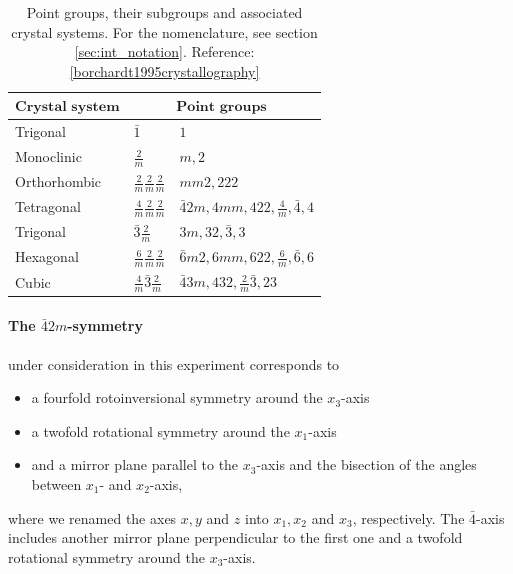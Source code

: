 \begin{table}[htdp]
    \begin{tabular}{|p{}|p{}|p{}|}
        \hline
        \rowcolor{LightCyan}
        $\textbf{Crystal system}$ & 
        \multicolumn{2}{|c|}{$\textbf{Point groups   }$} \\ 
        \hline
        Trigonal        & $ \bar{1} $   & $ 1 $  \\ 
        Monoclinic      & $\frac{2}{m}$ & $m, 2$     \\ 
        Orthorhombic    & $\frac{2}{m} \frac{2}{m} \frac{2}{m}$ & $mm2, 222$     \\
        Tetragonal      & $\frac{4}{m} \frac{2}{m} \frac{2}{m}$ & $\bar{4}2m, 4mm, 422, \frac{4}{m}, \bar{4}, 4$     \\ 
        Trigonal        & $\bar{3} \frac{2}{m}$         & $3m, 32, \bar{3}, 3$      \\ 
        Hexagonal       & $\frac{6}{m} \frac{2}{m} \frac{2}{m}$ & $\bar{6}m2, 6mm, 622, \frac{6}{m}, \bar{6}, 6$     \\ 
        Cubic           & $\frac{4}{m}\bar{3}\frac{2}{m}$ & $\bar{4}3m, 432, \frac{2}{m}\bar{3}, 23 $     \\ 
        \hline
    \end{tabular}
\caption{
    Point groups, their subgroups and associated crystal systems. For the nomenclature, see 
    section \ref{sec:int_notation}. 
    Reference: \ref{borchardt1995crystallography}
    }
\label{tab:point_groups}
\end{table}

\paragraph{The $\bar{4}2m$-symmetry}
under consideration in this experiment corresponds to 
\begin{itemize}
    \item
    a fourfold rotoinversional symmetry around the $x_3$-axis
    \item
    a twofold rotational symmetry around the $x_1$-axis
    \item
    and a mirror plane parallel to the $x_3$-axis and the bisection of the 
    angles between $x_1$- and $x_2$-axis, 
\end{itemize}
where we renamed the axes $x, y$ and $z$ into $x_1, x_2$ and $x_3$, respectively. 
The $\bar{4}$-axis includes another mirror 
plane perpendicular to the first one and a twofold rotational symmetry 
around the $x_3$-axis. 

